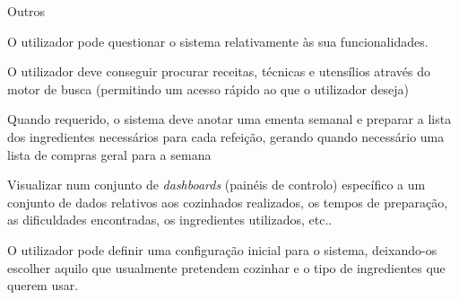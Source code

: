 \begin{requisitos}{Outros}
  
    \begin{requsr}{}{O utilizador pode questionar o sistema relativamente às sua funcionalidades.}
    
    
    \end{requsr}

  \begin{requsr}{}{O utilizador deve conseguir procurar receitas, técnicas e utensílios através do motor de busca (permitindo um acesso rápido ao que o utilizador deseja)}
  
    
    
    
  \end{requsr}

  \begin{requsr}{}{Quando requerido, o sistema deve anotar uma ementa semanal e preparar a lista dos ingredientes necessários para cada refeição, gerando quando necessário uma lista de compras geral para a semana}
  
    
    
    
  \end{requsr}

  \begin{requsr}{}{Visualizar num conjunto de \emph{dashboards} (painéis de controlo) específico a um conjunto de dados relativos aos cozinhados realizados, os tempos de preparação, as dificuldades encontradas, os ingredientes utilizados, etc..}
  
    
  \end{requsr}
  
  \begin{requsr}{}{O utilizador pode definir uma configuração inicial para o sistema, deixando-os escolher aquilo que usualmente pretendem cozinhar e o tipo de ingredientes que querem usar.}
  

\end{requsr}
\end{requisitos}
